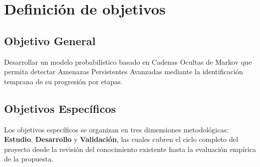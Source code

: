 \chapter{Definición de objetivos}

\section{Objetivo General}
\vspace{-0.17cm}
Desarrollar un modelo probabilístico basado en Cadenas Ocultas de Markov que permita detectar Amenazas Persistentes Avanzadas mediante la identificación temprana de su progresión por etapas.
\vspace{-0.35cm}

\section{Objetivos Específicos}
\vspace{-0.1cm}
Los objetivos específicos se organizan en tres dimensiones metodológicas: \textbf{Estudio}, \textbf{Desarrollo} y \textbf{Validación}, las cuales cubren el ciclo completo del proyecto desde la revisión del conocimiento existente hasta la evaluación empírica de la propuesta.
\vspace{-0.45cm}


